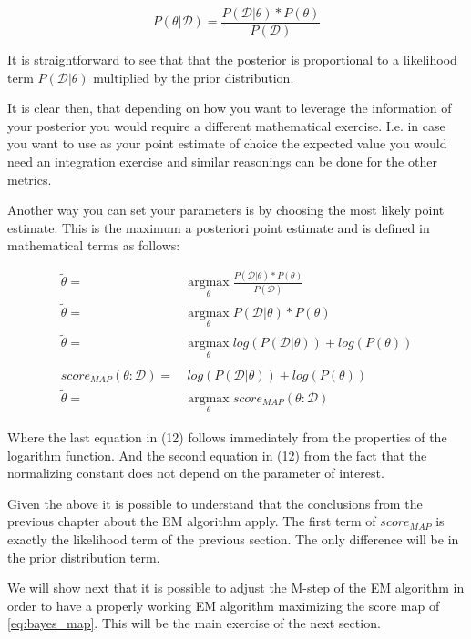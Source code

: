 \documentclass[11pt]{article}
\begin{document}
\begin{article}
\begin{equation} \label{eq:bayes_formula}
P (\theta | \mathscr{D}) = \frac{P (\mathscr{D} | \theta) * P(\theta)}{P (\mathscr{D})} 
\end{equation}

It is straightforward to see that that the posterior is proportional
to a likelihood term \(P (\mathscr{D} | \theta)\) multiplied by the
prior distribution.

It is clear then, that depending on how you want to leverage the
information of your posterior you would require a different
mathematical exercise. I.e. in case you want to use as your
point estimate of choice the expected value you would need an
integration exercise and similar reasonings can be done for the
other metrics.

Another way you can set your parameters is by choosing the most
likely point estimate. This is the maximum a posteriori point
estimate and is defined in mathematical terms as follows:

\begin{align} 
\tilde{\theta} =& \operatorname*{argmax}_{\theta} \frac{P (\mathscr{D} | \theta) * P(\theta)}{P (\mathscr{D})} \nonumber\\
\tilde{\theta} =& \operatorname*{argmax}_{\theta} P (\mathscr{D} | \theta) * P(\theta)\\ \label{eq:bayes_map}
\tilde{\theta} =& \operatorname*{argmax}_{\theta} log (P (\mathscr{D} | \theta)) + log (P(\theta)) \nonumber \\
\nonumber \\ 
score_{MAP} (\theta : \mathscr{D}) =& \ log (P (\mathscr{D} | \theta)) + log (P(\theta)) \nonumber\\
\tilde{\theta} =& \operatorname*{argmax}_{\theta} score_{MAP}(\theta : \mathscr{D})
\end{align}

Where the last equation in (12) follows immediately from the properties of
the logarithm function. And the second equation in (12) from the fact that
the normalizing constant does not depend on the parameter of
interest.

Given the above it is possible to understand that the conclusions
from the previous chapter about the EM algorithm apply. The first
term of \(score_{MAP}\) is exactly the likelihood term of the previous
section. The only difference will be in the prior distribution term.

We will show next that it is possible to adjust the M-step of the EM
algorithm in order to have a properly working EM algorithm
maximizing the score map of \ref{eq:bayes_map}. This will be the main
exercise of the next section.

\end{article}
\end{document}
